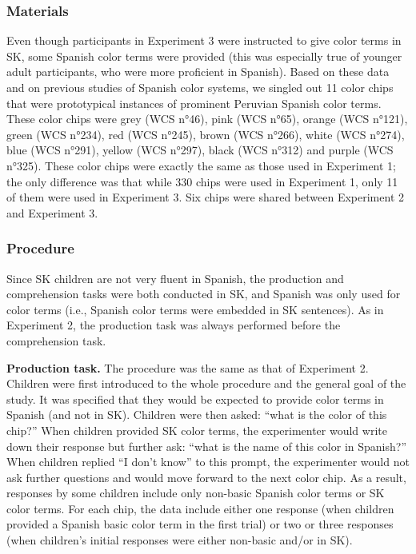 \documentclass[,man,floatsintext]{apa6}
\theoremstyle{definition}
\theoremstyle{definition}
\theoremstyle{definition}
\theoremstyle{remark}
\begin{document}
\subsubsection{Materials}\label{materials-2}

Even though participants in Experiment 3 were instructed to give color
terms in SK, some Spanish color terms were provided (this was especially
true of younger adult participants, who were more proficient in
Spanish). Based on these data and on previous studies of Spanish color
systems, we singled out 11 color chips that were prototypical instances
of prominent Peruvian Spanish color terms. These color chips were grey
(WCS n°46), pink (WCS n°65), orange (WCS n°121), green (WCS n°234), red
(WCS n°245), brown (WCS n°266), white (WCS n°274), blue (WCS n°291),
yellow (WCS n°297), black (WCS n°312) and purple (WCS n°325). These
color chips were exactly the same as those used in Experiment 1; the
only difference was that while 330 chips were used in Experiment 1, only
11 of them were used in Experiment 3. Six chips were shared between
Experiment 2 and Experiment 3.

\subsubsection{Procedure}\label{procedure-2}

Since SK children are not very fluent in Spanish, the production and
comprehension tasks were both conducted in SK, and Spanish was only used
for color terms (i.e., Spanish color terms were embedded in SK
sentences). As in Experiment 2, the production task was always performed
before the comprehension task.

\textbf{Production task.} The procedure was the same as that of
Experiment 2. Children were first introduced to the whole procedure and
the general goal of the study. It was specified that they would be
expected to provide color terms in Spanish (and not in SK). Children
were then asked: \enquote{what is the color of this chip?} When children
provided SK color terms, the experimenter would write down their
response but further ask: \enquote{what is the name of this color in
Spanish?} When children replied \enquote{I don't know} to this prompt,
the experimenter would not ask further questions and would move forward
to the next color chip. As a result, responses by some children include
only non-basic Spanish color terms or SK color terms. For each chip, the
data include either one response (when children provided a Spanish basic
color term in the first trial) or two or three responses (when
children's initial responses were either non-basic and/or in SK).
\end{document}
